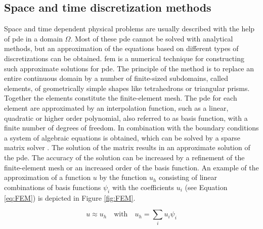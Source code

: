 \subsection{Space and time discretization methods}
\label{subsec:FEM}
Space and time dependent physical problems are usually described with the help of \gls{pde} in a domain $\Omega$. Most of these \gls{pde} cannot be solved with analytical methods, but an approximation of the equations based on different types of discretizations can be obtained. \Gls{fem} is a numerical technique for constructing such approximate solutions for \gls{pde}. The principle of the method is to replace an entire continuous domain by a number of finite-sized subdomains, called elements, of geometrically simple shapes like tetrahedrons or triangular prisms. Together the elements constitute the finite-element mesh. The \gls{pde} for each element are approximated by an interpolation function, such as a linear, quadratic or higher order polynomial, also referred to as basis function, with a finite number of degrees of freedom. In combination with the boundary conditions a  system of algebraic equations is obtained, which can be solved by a sparse matrix solver \cite{john2016finite}. The solution of the matrix results in an approximate solution of the \gls{pde}. The accuracy of the solution can be increased by a refinement of the finite-element mesh or an increased order of the basis function. An example of the approximation of a function $u$ by the function $u_{h}$ consisting of linear combinations of basis functions $\psi_{i}$ with the coefficients $u_{i}$ (see Equation \ref{eq:FEM}) is depicted in Figure \ref{fig:FEM}. 

\begin{equation}
u\approx u_{h} \quad \textrm{with} \quad u_{h}=\sum_{i}u_{i}\psi_{i}
\label{eq:FEM}
\end{equation}

